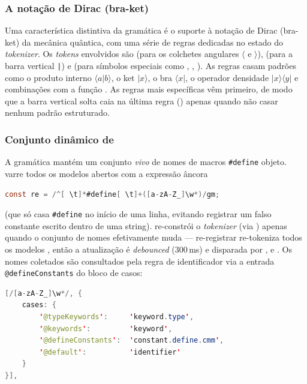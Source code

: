 \subsubsection{A notação de Dirac (bra-ket)}
\label{sec:editor-dirac}

Uma característica distintiva da gramática \cmm{} é o suporte à notação de Dirac
(bra-ket) da mecânica quântica, com uma série de regras dedicadas no estado
 do \emph{tokenizer}. Os \emph{tokens} envolvidos são
 (para os colchetes angulares $\langle$ e $\rangle$),
 (para a barra vertical \lstinline+|+) e
 (para símbolos especiais como , ,
). As regras casam padrões como o produto interno
$\langle a | b \rangle$, o ket $| x \rangle$, o bra $\langle x |$, o operador
densidade $| x \rangle\langle y |$ e combinações com a função .
As regras mais específicas vêm primeiro, de modo que a
barra vertical solta caia na última regra () apenas quando não
casar nenhum padrão estruturado.

\subsubsection{Conjunto dinâmico de }
\label{sec:editor-cmm-define}

A gramática \cmm{} mantém um conjunto \emph{vivo} de nomes de macros
\lstinline|#define| objeto.  varre todos os modelos
 abertos com a expressão âncora

\begin{lstlisting}[language=Java]
const re = /^[ \t]*#define[ \t]+([a-zA-Z_]\w*)/gm;
\end{lstlisting}

\noindent
(que só casa \lstinline|#define| no início de uma linha, evitando registrar um
falso constante escrito dentro de uma string). 
re-constrói o \emph{tokenizer} (via ) apenas quando
o conjunto de nomes efetivamente muda --- re-registrar re-tokeniza todos os
modelos , então a atualização é \emph{debounced}
(300\,ms) e disparada por ,
 e . Os nomes coletados
são consultados pela regra de identificador via a entrada
\lstinline|@defineConstants| do bloco de casos:

\begin{lstlisting}[language=Java]
[/[a-zA-Z_]\w*/, {
    cases: {
        '@typeKeywords':     'keyword.type',
        '@keywords':         'keyword',
        '@defineConstants':  'constant.define.cmm',
        '@default':          'identifier'
    }
}],
\end{lstlisting}

